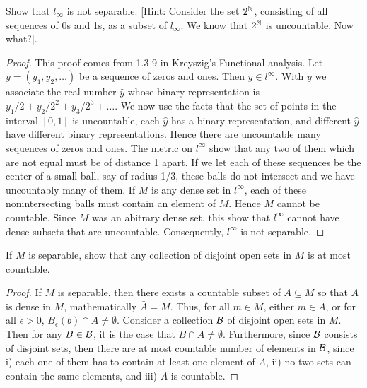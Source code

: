 \begin{exercise}{50}
Show that $l_\infty$ is not separable.
[Hint: Consider the set $2^{\mathbb{N}}$, consisting of all sequences of 0s and 1s, as a subset of $l_\infty$.
We know that $2^{\mathbb{N}}$ is uncountable.
Now what?].
\end{exercise}
\begin{proof}
This proof comes from 1.3-9 in Kreyszig's Functional analysis.
Let $y=(y_1,y_2,\dots)$ be a sequence of zeros and ones.
Then $y\in l^\infty$.
With $y$ we associate the real number $\hat{y}$ whose binary representation is $y_1/2 + y_2/2^2 + y_3/2^3 +\dots$.
We now use the facts that the set of points in the interval $[0,1]$ is uncountable, each $\hat{y}$ has a binary representation, and different $\hat{y}$ have different binary representations.
Hence there are uncountable many sequences of zeros and ones.
The metric on $l^\infty$ show that any two of them which are not equal must be of distance 1 apart.
If we let each of these sequences be the center of a small ball, say of radius 1/3, these balls do not intersect and we have uncountably many of them.
If $M$ is any dense set in $l^\infty$, each of these nonintersecting balls must contain an element of $M$.
Hence $M$ cannot be countable.
Since $M$ was an abitrary dense set, this show that $l^\infty$ cannot have dense subsets that are uncountable.
Consequently, $l^\infty$ is not separable.
\end{proof} 

\begin{exercise}{52}
If $M$ is separable, show that any collection of disjoint open sets in $M$ is at most countable.
\end{exercise}
\begin{proof}
If $M$ is separable, then there exists a countable subset of $A\subseteq M$ so that $A$ is dense in $M$, mathematically $\bar{A}=M$.
Thus, for all $m\in M$, either $m\in A$, or for all $\epsilon>0$, $B_\epsilon(b)\cap A\neq\emptyset$.
Consider a collection $\mathcal{B}$ of disjoint open sets in $M$.
Then for any $B\in \mathcal{B}$, it is the case that $B\cap A\neq\emptyset$. 
Furthermore, since $\mathcal{B}$ consists of disjoint sets, then there are at most countable number of elements in $\mathcal{B}$, since i) each one of them has to contain at least one element of $A$, ii) no two sets can contain the same elements, and iii) $A$ is countable.
\end{proof} 

